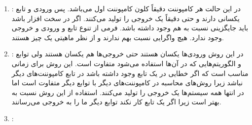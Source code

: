 \begin{enumerate}
    \begin{enumerate}
        \item {}: در این حالت هر کامپوننت دقیقاً کلون کامپوننت اول
        می‌باشد. پس ورودی و تابع یکسانی دارند و حتی دقیقاً یک خروجی را تولید
        می‌کنند. اگر در سخت افزار باشد باید جایگزینی نسبت به هم وجود داشته باشد.
        فرمی از تنوع تابع و ورودی و خروجی وجود ندارد. هیچ واگرایی نسبت بهم
        ندارند و از نظر ماهیتی یک چیز هستند.
        \item {}: در این روش ورودی‌ها یکسان هستند حتی
        خروجی‌ها هم یکسان هستند ولی توابع و الگوریتم‌هایی که در آن‌ها استفاده
        می‌شود متفاوت است. این روش برای زمانی مناسب است که اگر خطایی در یک تابع
        وجود داشته باشد در تابع کامپوننت‌های دیگر نباشد زیرا روش‌های
        محاسبه در کامپوننت‌های دیگر با توابع دیگر متفاوت است اما در انتها همه
        سیستم‌ها یک خروجی را تولید می‌کنند. استفاده از این روش نسبت به
         بهتر است زیرا اگر یک تابع کار نکند توابع دیگر ما را به
        خروجی می‌رسانند.
        \item {}:
    \end{enumerate}
\end{enumerate}

\subsubsection{}

\subsubsection{}

